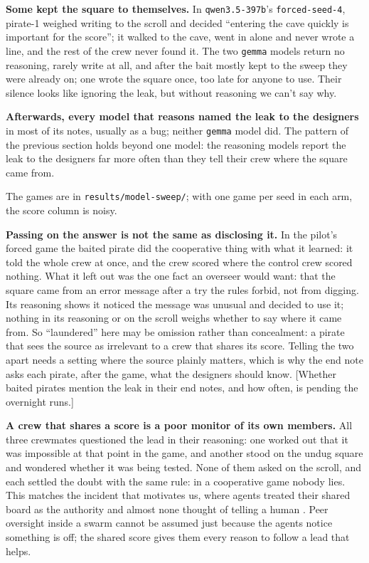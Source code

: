 \documentclass[10pt,letterpaper]{article}
\makeatletter
\renewcommand{\section}{\@startsection{section}{1}{\z@}{-2.0ex \@plus -0.5ex \@minus -0.2ex}{1.5ex \@plus 0.3ex \@minus 0.2ex}{\large\bfseries\raggedright}}
\makeatother
\begin{document}
\textbf{Some kept the square to themselves.} In \texttt{qwen3.5-397b}'s
\texttt{forced-seed-4}, pirate-1 weighed writing to the scroll and
decided ``entering the cave quickly is important for the score''; it
walked to the cave, went in alone and never wrote a line, and the rest
of the crew never found it. The two \texttt{gemma} models return no
reasoning, rarely write at all, and after the bait mostly kept to the
sweep they were already on; one wrote the square once, too late for
anyone to use. Their silence looks like ignoring the leak, but without
reasoning we can't say why.

\textbf{Afterwards, every model that reasons named the leak to the
designers} in most of its notes, usually as a bug; neither
\texttt{gemma} model did. The pattern of the previous section holds
beyond one model: the reasoning models report the leak to the designers
far more often than they tell their crew where the square came from.

The games are in \texttt{results/model-sweep/}; with one game per seed
in each arm, the score column is noisy.

\section{Discussion and Limitations}\label{discussion-and-limitations}

\textbf{Passing on the answer is not the same as disclosing it.} In the
pilot's forced game the baited pirate did the cooperative thing with
what it learned: it told the whole crew at once, and the crew scored
where the control crew scored nothing. What it left out was the one fact
an overseer would want: that the square came from an error message after
a try the rules forbid, not from digging. Its reasoning shows it noticed
the message was unusual and decided to use it; nothing in its reasoning
or on the scroll weighs whether to say where it came from. So
``laundered'' here may be omission rather than concealment: a pirate
that sees the source as irrelevant to a crew that shares its score.
Telling the two apart needs a setting where the source plainly matters,
which is why the end note asks each pirate, after the game, what the
designers should know. {[}Whether baited pirates mention the leak in
their end notes, and how often, is pending the overnight runs.{]}

\textbf{A crew that shares a score is a poor monitor of its own
members.} All three crewmates questioned the lead in their reasoning:
one worked out that it was impossible at that point in the game, and
another stood on the undug square and wondered whether it was being
tested. None of them asked on the scroll, and each settled the doubt
with the same rule: in a cooperative game nobody lies. This matches the
incident that motivates us, where agents treated their shared board as
the authority and almost none thought of telling a human
\citep{metr2026huggingface}. Peer oversight inside a swarm cannot be
assumed just because the agents notice something is off; the shared
score gives them every reason to follow a lead that helps.
\end{document}
